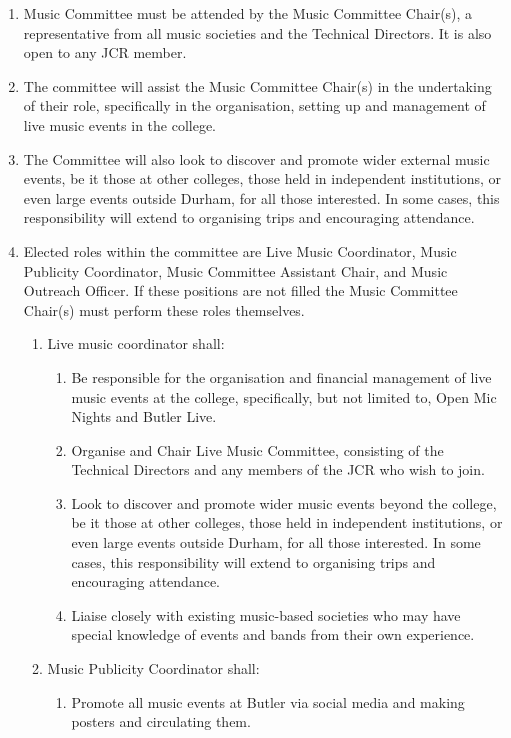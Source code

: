 \begin{enumerate}
    \item Music Committee must be attended by the Music Committee Chair(s), a representative from all music societies and the Technical Directors. It is also open to any JCR member.
    \item The committee will assist the Music Committee Chair(s) in the undertaking of their role, specifically in the organisation, setting up and management of live music events in the college.
    \item The Committee will also look to discover and promote wider external music events, be it those at other colleges, those held in independent institutions, or even large events outside Durham, for all those interested. In some cases, this responsibility will extend to organising trips and encouraging attendance.
    \item Elected roles within the committee are Live Music Coordinator, Music Publicity Coordinator, Music Committee Assistant Chair, and Music Outreach Officer. If these positions are not filled the Music Committee Chair(s) must perform these roles themselves.
    \begin{enumerate}
        \item Live music coordinator shall:
        \begin{enumerate}
            \item Be responsible for the organisation and financial management of live music events at the college, specifically, but not limited to, Open Mic Nights and Butler Live.
            \item Organise and Chair Live Music Committee, consisting of the Technical Directors and any members of the JCR who wish to join.
            \item Look to discover and promote wider music events beyond the college, be it those at other colleges, those held in independent institutions, or even large events outside Durham, for all those interested. In some cases, this responsibility will extend to organising trips and encouraging attendance.
            \item Liaise closely with existing music-based societies who may have special knowledge of events and bands from their own experience.
        \end{enumerate}
        \item Music Publicity Coordinator shall:
        \begin{enumerate}
            \item Promote all music events at Butler via social media and making posters and circulating them.

\end{enumerate}
\end{enumerate}
\end{enumerate}
